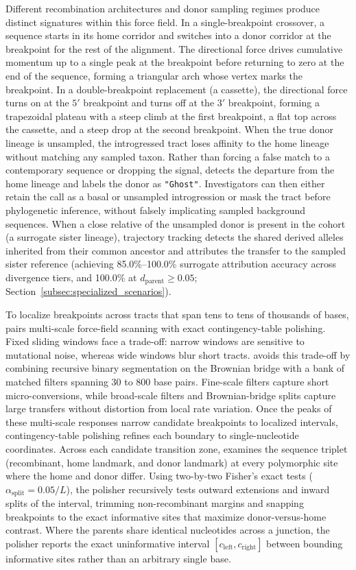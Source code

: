 Different recombination architectures and donor sampling regimes produce distinct signatures within this force field. In a single-breakpoint crossover, a sequence starts in its home corridor and switches into a donor corridor at the breakpoint for the rest of the alignment. The directional force drives cumulative momentum up to a single peak at the breakpoint before returning to zero at the end of the sequence, forming a triangular arch whose vertex marks the breakpoint. In a double-breakpoint replacement (a cassette), the directional force turns on at the $5'$ breakpoint and turns off at the $3'$ breakpoint, forming a trapezoidal plateau with a steep climb at the first breakpoint, a flat top across the cassette, and a steep drop at the second breakpoint. When the true donor lineage is unsampled, the introgressed tract loses affinity to the home lineage without matching any sampled taxon. Rather than forcing a false match to a contemporary sequence or dropping the signal, \RhizAeon detects the departure from the home lineage and labels the donor as \texttt{"Ghost"}. Investigators can then either retain the call as a basal or unsampled introgression or mask the tract before phylogenetic inference, without falsely implicating sampled background sequences. When a close relative of the unsampled donor is present in the cohort (a surrogate sister lineage), trajectory tracking detects the shared derived alleles inherited from their common ancestor and attributes the transfer to the sampled sister reference (achieving 85.0\%--100.0\% surrogate attribution accuracy across divergence tiers, and 100.0\% at $d_{\mathrm{parent}} \ge 0.05$; Section~\ref{subsec:specialized_scenarios}).

To localize breakpoints across tracts that span tens to tens of thousands of bases, \RhizAeon pairs multi-scale force-field scanning with exact contingency-table polishing. Fixed sliding windows face a trade-off: narrow windows are sensitive to mutational noise, whereas wide windows blur short tracts. \RhizAeon avoids this trade-off by combining recursive binary segmentation on the Brownian bridge with a bank of matched filters spanning 30 to 800 base pairs. Fine-scale filters capture short micro-conversions, while broad-scale filters and Brownian-bridge splits capture large transfers without distortion from local rate variation. Once the peaks of these multi-scale responses narrow candidate breakpoints to localized intervals, contingency-table polishing refines each boundary to single-nucleotide coordinates. Across each candidate transition zone, \RhizAeon examines the sequence triplet (recombinant, home landmark, and donor landmark) at every polymorphic site where the home and donor differ. Using two-by-two Fisher's exact tests ($\alpha_{\mathrm{split}} = 0.05 / L$), the polisher recursively tests outward extensions and inward splits of the interval, trimming non-recombinant margins and snapping breakpoints to the exact informative sites that maximize donor-versus-home contrast. Where the parents share identical nucleotides across a junction, the polisher reports the exact uninformative interval $[c_{\mathrm{left}}, c_{\mathrm{right}}]$ between bounding informative sites rather than an arbitrary single base.

